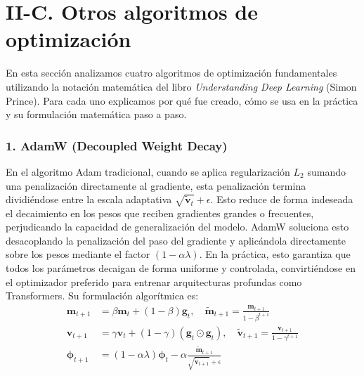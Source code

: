 \documentclass[10pt,a4paper]{article}
\begin{document}
\clearpage
{\setlength{\abovedisplayskip}{1.5pt}\setlength{\belowdisplayskip}{1.5pt}\setlength{\jot}{0.5pt}
\section*{II-C. Otros algoritmos de optimización}

En esta sección analizamos cuatro algoritmos de optimización fundamentales utilizando la notación matemática del libro \textit{Understanding Deep Learning} (Simon Prince). Para cada uno explicamos por qué fue creado, cómo se usa en la práctica y su formulación matemática paso a paso.

\subsubsection*{1. AdamW (Decoupled Weight Decay)}
En el algoritmo Adam tradicional, cuando se aplica regularización $L_2$ sumando una penalización directamente al gradiente, esta penalización termina dividiéndose entre la escala adaptativa $\sqrt{\tilde{\mathbf{v}}_t} + \epsilon$. Esto reduce de forma indeseada el decaimiento en los pesos que reciben gradientes grandes o frecuentes, perjudicando la capacidad de generalización del modelo. AdamW soluciona esto desacoplando la penalización del paso del gradiente y aplicándola directamente sobre los pesos mediante el factor $(1 - \alpha \lambda)$. En la práctica, esto garantiza que todos los parámetros decaigan de forma uniforme y controlada, convirtiéndose en el optimizador preferido para entrenar arquitecturas profundas como Transformers. Su formulación algorítmica es:
\begin{align*}
\mathbf{m}_{t+1} &= \beta \mathbf{m}_t + (1 - \beta) \mathbf{g}_t, \quad \tilde{\mathbf{m}}_{t+1} = \frac{\mathbf{m}_{t+1}}{1 - \beta^{t+1}} \\[0.01cm]
\mathbf{v}_{t+1} &= \gamma \mathbf{v}_t + (1 - \gamma) (\mathbf{g}_t \odot \mathbf{g}_t), \quad \tilde{\mathbf{v}}_{t+1} = \frac{\mathbf{v}_{t+1}}{1 - \gamma^{t+1}} \\[0.01cm]
\boldsymbol{\phi}_{t+1} &= (1 - \alpha \lambda) \boldsymbol{\phi}_t - \alpha \frac{\tilde{\mathbf{m}}_{t+1}}{\sqrt{\tilde{\mathbf{v}}_{t+1}} + \epsilon}
\end{align*}

}
\end{document}
